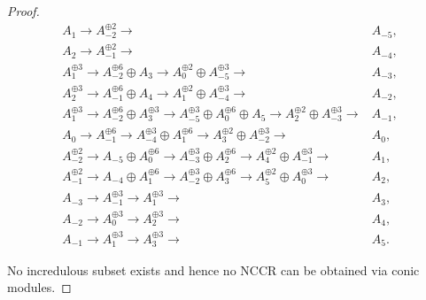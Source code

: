 \documentclass[reqno, 12pt]{amsart}
\theoremstyle{definition}
\numberwithin{equation}{section}
\begin{document}
\begin{proof}
    \begin{align*}
        A_{1}\longrightarrow A_{-2}^{\oplus 2}\longrightarrow & A_{-5},\\
        A_2\longrightarrow A_{-1}^{\oplus 2}\longrightarrow & A_{-4},\\
        A_1^{\oplus 3}\longrightarrow A_{-2}^{\oplus 6}\oplus A_3\longrightarrow A_0^{\oplus 2}\oplus A_{-5}^{\oplus 3}\longrightarrow & A_{-3},\\
        A_2^{\oplus 3}\longrightarrow A_{-1}^{\oplus 6}\oplus A_4\longrightarrow A_1^{\oplus 2}\oplus A_{-4}^{\oplus 3}\longrightarrow & A_{-2},\\
        A_1^{\oplus 3}\longrightarrow A_{-2}^{\oplus 6}\oplus A_3^{\oplus 3}\longrightarrow A_{-5}^{\oplus 3}\oplus A_0^{\oplus 6}\oplus A_5\longrightarrow A_2^{\oplus 2}\oplus A_{-3}^{\oplus 3}\longrightarrow & A_{-1},\\
        A_0\longrightarrow A_{-1}^{\oplus 6}\longrightarrow A_{-4}^{\oplus 3}\oplus A_1^{\oplus 6}\longrightarrow A_3^{\oplus 2}\oplus A_{-2}^{\oplus 3}\longrightarrow & A_0,\\
        A_{-2}^{\oplus 2}\longrightarrow A_{-5}\oplus A_0^{\oplus 6}\longrightarrow A_{-3}^{\oplus 3}\oplus A_2^{\oplus 6}\longrightarrow A_4^{\oplus 2}\oplus A_{-1}^{\oplus3}\longrightarrow & A_1,\\
        A_{-1}^{\oplus 2}\longrightarrow A_{-4}\oplus A_1^{\oplus 6}\longrightarrow A_{-2}^{\oplus 3}\oplus A_3^{\oplus 6}\longrightarrow A_5^{\oplus 2}\oplus A_0^{\oplus 3}\longrightarrow & A_2,\\
        A_{-3}\longrightarrow A_{-1}^{\oplus 3}\longrightarrow A_1^{\oplus 3}\longrightarrow & A_3,\\
        A_{-2}\longrightarrow A_0^{\oplus 3}\longrightarrow A_2^{\oplus 3}\longrightarrow & A_4,\\
        A_{-1}\longrightarrow A_1^{\oplus 3}\longrightarrow A_3^{\oplus 3}\longrightarrow & A_5.
    \end{align*}


    No incredulous subset exists and hence no NCCR can be obtained via conic modules.
    

\end{proof}
\end{document}
